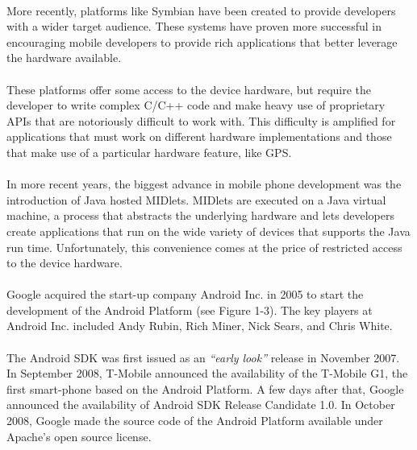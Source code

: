 \paragraph{}
More recently, platforms like Symbian have been created to provide developers with a wider target audience. These systems have proven more successful in encouraging mobile developers to provide rich applications that better leverage the hardware available.

\paragraph{}
These platforms offer some access to the device hardware, but require the developer to write complex C/C++ code and make heavy use of proprietary APIs that are notoriously difficult to work with. This difficulty is amplified for applications that must work on different hardware implementations and those that make use of a particular hardware feature, like GPS.

\paragraph{}
In more recent years, the biggest advance in mobile phone development was the introduction of Java hosted MIDlets. MIDlets are executed on a Java virtual machine, a process that abstracts the underlying hardware and lets developers create applications that run on the wide variety of devices that supports the Java run time. Unfortunately, this convenience comes at the price of restricted access to the device hardware.

\paragraph{}
Google acquired the start-up company Android Inc. in 2005 to start the development of the Android Platform (see Figure 1-3). The key players at Android Inc. included Andy Rubin, Rich Miner, Nick Sears, and Chris White.

\paragraph{}
The Android SDK was first issued as an \emph{“early look”} release in November 2007. In September 2008, T-Mobile announced the availability of the T-Mobile G1, the first smart-phone based on the Android Platform. A few days after that, Google announced the availability of Android SDK Release Candidate 1.0. In October 2008, Google made the source code of the Android Platform available under Apache's open source license.

